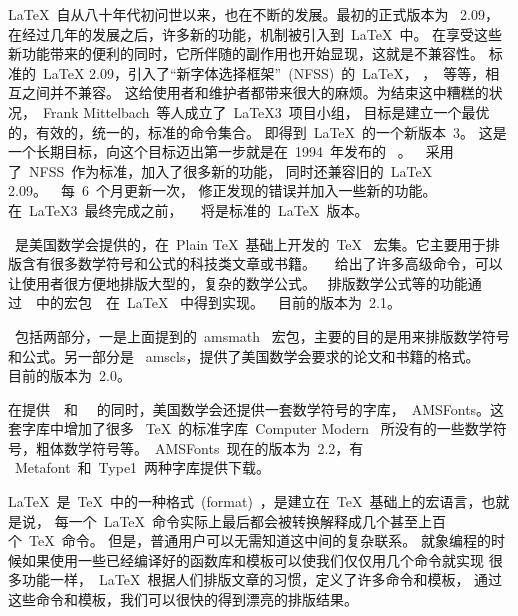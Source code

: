 \documentclass[a4paper]{article}
\begin{document}
\LaTeX{}~自从八十年代初问世以来，也在不断的发展。最初的正式版本为
~2.09，在经过几年的发展之后，许多新的功能，机制被引入到~\LaTeX{}~中。
在享受这些新功能带来的便利的同时，它所伴随的副作用也开始显现，这就是不兼容性。
标准的~\LaTeX{}
2.09，引入了“新字体选择框架”~(NFSS)~的~\LaTeX{}，
\SLiTeX{}，\AMSLaTeX{}~等等，相互之间并不兼容。
这给使用者和维护者都带来很大的麻烦。为结束这中糟糕的状况，~Frank
Mittelbach~等人成立了~\LaTeX{}3~项目小组，
目标是建立一个最优的，有效的，统一的，标准的命令集合。
即得到~\LaTeX{}~的一个新版本~3。
这是一个长期目标，向这个目标迈出第一步就是在~1994~年发布的
~\LaTeXe{}。~\LaTeXe{}~采用了~NFSS~作为标准，加入了很多新的功能，
同时还兼容旧的~\LaTeX{} 2.09。~\LaTeXe{}~每~6~个月更新一次，
修正发现的错误并加入一些新的功能。在~\LaTeX{}3~最终完成之前，
~\LaTeXe{}~将是标准的~\LaTeX{}~版本。


\AMSTeX{}~是美国数学会提供的，在~Plain \TeX{}~基础上开发的~\TeX{}~
宏集。它主要用于排版含有很多数学符号和公式的科技类文章或书籍。~\AMSTeX{}~
给出了许多高级命令，可以让使用者很方便地排版大型的，复杂的数学公式。\AMSTeX{}~
排版数学公式等的功能通过~\AMSLaTeX{}~中的宏包~~在~\LaTeX{}~
中得到实现。~\AMSTeX{}~目前的版本为~2.1。

\AMSLaTeX{}~包括两部分，一是上面提到的~amsmath~
宏包，主要的目的是用来排版数学符号和公式。另一部分是
~amscls，提供了美国数学会要求的论文和书籍的格式。~\AMSLaTeX{}~
目前的版本为~2.0。

在提供~\AMSTeX{}~和~\AMSLaTeX{}~
的同时，美国数学会还提供一套数学符号的字库，~AMSFonts。这套字库中增加了很多
~\TeX{}~的标准字库~Computer Modern~
所没有的一些数学符号，粗体数学符号等。~AMSFonts~现在的版本为~2.2，有
~Metafont~和~Type1~两种字库提供下载。


\LaTeX{}~是~\TeX{}~中的一种格式~(format)~，是建立在~\TeX{}~基础上的宏语言，也就是说，
每一个~\LaTeX{}~命令实际上最后都会被转换解释成几个甚至上百个~\TeX{}~命令。
但是，普通用户可以无需知道这中间的复杂联系。
就象编程的时候如果使用一些已经编译好的函数库和模板可以使我们仅仅用几个命令就实现
很多功能一样，~\LaTeX{}~根据人们排版文章的习惯，定义了许多命令和模板，
通过这些命令和模板，我们可以很快的得到漂亮的排版结果。

\end{document}
